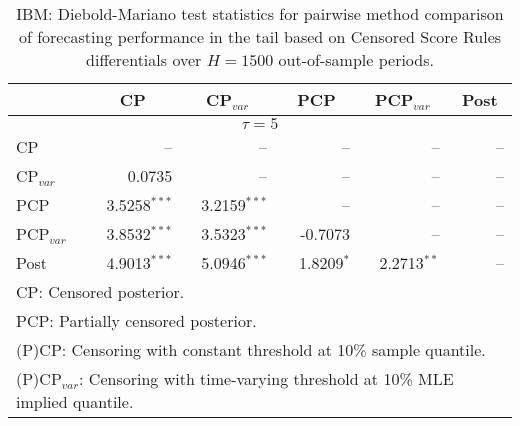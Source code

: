 { \renewcommand{\arraystretch}{1.2} 
\begin{table} 
\center 
\begin{tabular}{l | rrrrr} 
& \multicolumn{1}{c}{CP}& \multicolumn{1}{c}{CP$_{var}$}& \multicolumn{1}{c}{PCP}& \multicolumn{1}{c}{PCP$_{var}$}& \multicolumn{1}{c}{Post} \\ \hline 
\multicolumn{6}{c}{$\tau = 5$} \\ \hline 
CP &    --\phantom{$^{***}$} &    --\phantom{$^{***}$} &    --\phantom{$^{***}$} &    --\phantom{$^{***}$} &    --\phantom{$^{***}$}   \\ 
CP$_{var}$ & 0.0735\phantom{$^{***}$} &    --\phantom{$^{***}$} &    --\phantom{$^{***}$} &    --\phantom{$^{***}$} &    --\phantom{$^{***}$}   \\ 
PCP & 3.5258$^{***}$ & 3.2159$^{***}$ &    --\phantom{$^{***}$} &    --\phantom{$^{***}$} &    --\phantom{$^{***}$}   \\ 
PCP$_{var}$ & 3.8532$^{***}$ & 3.5323$^{***}$ & -0.7073\phantom{$^{***}$} &    --\phantom{$^{***}$} &    --\phantom{$^{***}$}   \\ 
Post & 4.9013$^{***}$ & 5.0946$^{***}$ & 1.8209$^{*}$\phantom{$^{**}$} & 2.2713$^{**}$\phantom{$^{*}$} &    --\phantom{$^{***}$}   \\ 
\hline 
\multicolumn{6}{l}{\footnotesize{CP: Censored posterior.}}  \\ 
\multicolumn{6}{l}{\footnotesize{PCP: Partially censored posterior.}} \\ 
\multicolumn{6}{l}{\footnotesize{(P)CP: Censoring with constant threshold at 10\% sample quantile.}}  \\ 
\multicolumn{6}{l}{\footnotesize{(P)CP$_{var}$: Censoring with time-varying threshold at 10\% MLE implied quantile.}} \\ 
\end{tabular}
 \caption{IBM: Diebold-Mariano test statistics for  pairwise method comparison of forecasting performance in the tail based on  Censored Score Rules differentials over $H=1500$ out-of-sample periods. }
\label{tab:IBM_DM_5}  
\end{table}
}